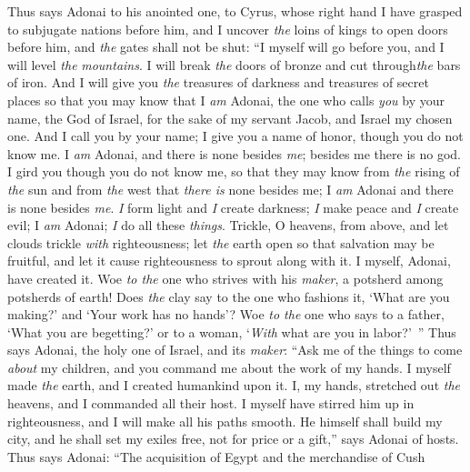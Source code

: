 \begin{biblechapter} %
\verse Thus says Adonai to his anointed one, 
to Cyrus, whose right hand I have grasped 
to subjugate nations before him, 
and I uncover \textit{the} loins of kings 
to open doors before him, 
and \textit{the} gates shall not be shut:
\verse “I myself will go before you, 
and I will level \textit{the} \textit{mountains}. 
I will break \textit{the} doors of bronze 
and cut through\textit{the} bars of iron.
\verse And I will give you \textit{the} treasures of darkness 
and treasures of secret places 
so that you may know that I \textit{am} Adonai, 
the one who calls \textit{you} by your name, the God of Israel,
\verse for the sake of my servant Jacob, 
and Israel my chosen one. 
And I call you by your name; 
I give you a name of honor, though you do not know me.
\verse I \textit{am} Adonai, and there is none besides \textit{me}; 
besides me there is no god. 
I gird you though you do not know me,
\verse so that they may know from \textit{the} rising of \textit{the} sun 
and from \textit{the} west that \textit{there is} none besides me; 
I \textit{am} Adonai and there is none besides \textit{me}.
\verse \textit{I} form light and \textit{I} create darkness; 
\textit{I} make peace and \textit{I} create evil; 
I \textit{am} Adonai; \textit{I} do all these \textit{things}.
\verse Trickle, O heavens, from above, 
and let clouds trickle \textit{with} righteousness; 
let \textit{the} earth open so that salvation may be fruitful, 
and let it cause righteousness to sprout along with it. 
I myself, Adonai, have created it.
\verse Woe \textit{to the} one who strives with his \textit{maker}, 
a potsherd among potsherds of earth! 
Does \textit{the} clay say to the one who fashions it, 
‘What are you making?’ 
and ‘Your work has no hands’?
\verse Woe \textit{to the} one who says to a father, ‘What you are begetting?’ 
or to a woman, ‘\textit{With} what are you in labor?’ ”
\verse Thus says Adonai, the holy one of Israel, 
and its \textit{maker}: 
“Ask me of the things to come \textit{about} my children, 
and you command me about the work of my hands.
\verse I myself made \textit{the} earth, 
and I created humankind upon it. 
I, my hands, stretched out \textit{the} heavens, 
and I commanded all their host.
\verse I myself have stirred him up in righteousness, 
and I will make all his paths smooth. 
He himself shall build my city, 
and he shall set my exiles free, not for price or a gift,” says Adonai of hosts.
 Thus says Adonai: 
“The acquisition of Egypt 
and the merchandise of Cush 

\end{biblechapter}

